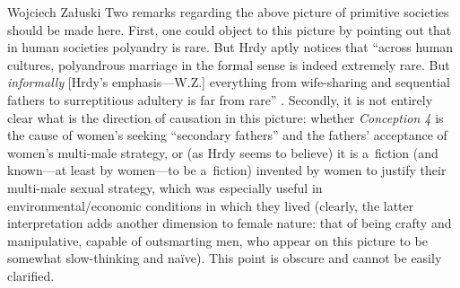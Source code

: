 \begin{artengenv}{Wojciech Załuski}
Two remarks regarding the above picture of primitive societies should be made here. First, one could object to this picture by pointing out that in human societies polyandry is rare. But Hrdy aptly notices that ``across human cultures, polyandrous marriage in the formal sense is indeed extremely rare. But \textit{informally} [Hrdy's emphasis---W.Z.] everything from wife-sharing and sequential fathers to surreptitious adultery is far from rare''
\parencite[][pp.xxii--xxiii]{hrdy_woman_1999}. %
 Secondly, it is not entirely clear what is the direction of causation in this picture: whether \textit{Conception 4} is the cause of women's seeking ``secondary fathers'' and the fathers' acceptance of women's multi-male strategy, or (as Hrdy seems to believe) it is a~fiction (and known---at least by women---to be a~fiction) invented by women to justify their multi-male sexual strategy, which was especially useful in environmental/economic conditions in which they lived (clearly, the latter interpretation adds another dimension to female nature: that of being crafty and manipulative, capable of outsmarting men, who appear on this picture to be somewhat slow-thinking and naïve). This point is obscure and cannot be easily clarified.


\end{artengenv}
